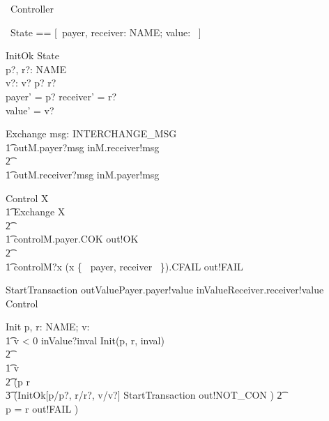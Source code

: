 \documentclass{article}
\begin{document}
\begin{circus}
      \circprocess\ Controller \circdef \circbegin
\end{circus}

\begin{circusaction}
     \circstate\ State == [~payer, receiver: NAME; value: \nat ~]
\end{circusaction}

\begin{schema}{InitOk}
     \Delta State \\
     p?, r?: NAME \\
     v?: \nat
\where
      v?  \land p? \neq r? \\
      payer' = p? \land receiver' = r? \\
      value' = v?
\end{schema}

\begin{circusaction}
     Exchange \circdef \circvar msg: INTERCHANGE\_MSG \circspot \\
     	\t1 outM.payer?msg \then inM.receiver!msg \then \Skip \\
		\t2 \extchoice \\
	\t1 outM.receiver?msg \then inM.payer!msg \then \Skip
\end{circusaction}

\begin{circusaction}
     Control \circdef \circmu X \circspot \\
     	\t1 Exchange \circseq X \\
		\t2 \extchoice \\
	\t1 controlM.payer.COK \then out!OK \then \Skip \\
		\t2 \extchoice \\
	\t1 controlM?x \prefixcolon (x \in \{~ payer, receiver ~\}).CFAIL \then out!FAIL \then \Skip
\end{circusaction}

\begin{circusaction}
     StartTransaction \circdef outValuePayer.payer!value \then inValueReceiver.receiver!value \then Control
\end{circusaction}

\begin{circusaction}
     Init \circdef p, r: NAME; v: \nat \circspot \\
     	\t1 \lcircguard v < 0 \rcircguard \circguard inValue?inval \then Init(p, r, inval) \\
		\t2 \extchoice \\
	\t1 \lcircguard v  \rcircguard \circguard \\
		\t2 (\lcircguard p \neq r \rcircguard \circguard \\
				\t3 (\lschexpract InitOk[p/p?, r/r?, v/v?] \rschexpract \circseq StartTransaction \intchoice out!NOT\_CON \then \Skip)
			\t2 \extchoice \\
		     \lcircguard p = r \rcircguard \circguard out!FAIL \then \Skip)
\end{circusaction}
\end{document}
